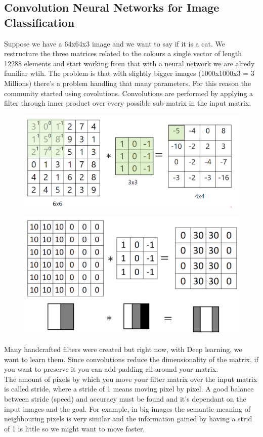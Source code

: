 \documentclass{article}
\begin{document}
\subsection{Convolution Neural Networks for Image Classification}
Suppose we have a 64x64x3 image and we want to say if it is a cat. We restructure the three matrices related to the colours a single vector of length 12288 elements and start working from that with a neural network we are alredy familiar wtih. The problem is that with slightly bigger images (1000x1000x3 = 3 Millions) there's a problem handling that many parameters. For this reason the community started using covolutions. Convolutions are performed by applying a filter through inner product over every possible sub-matrix in the input matrix. 
\begin{figure}[htbp]
    \centering
    \includegraphics[width=12cm]{convolution_example.png}
\end{figure}
\begin{figure}[htbp]
    \centering
    \includegraphics[width=12cm]{vertical_edge_example.png}
\end{figure}

Many handcrafted filters were created but right now, with Deep learning, we want to learn them. Since convolutions reduce the dimensionality of the matrix, if you want to preserve it you can add padding all around your matrix.\\
The amount of pixels by which you move your filter matrix over the input matrix is called stride, where a stride of 1 means moving pixel by pixel. A good balance between stride (speed) and accuracy must be found and it's dependant on the input images and the goal. For example, in big images the semantic meaning of neighbouring pixels is very similar and the information gained by having a strid of 1 is little so we might want to move faster.
\end{document}
